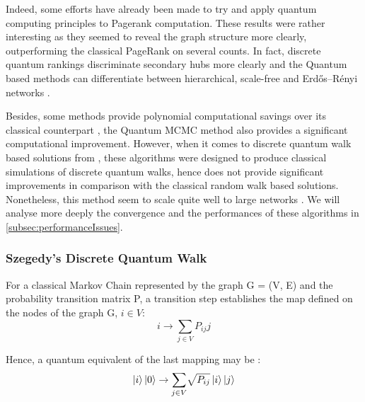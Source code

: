 \documentclass[sn-mathphys]{sn-jnl}%
\theoremstyle{thmstyleone}%
\theoremstyle{thmstyletwo}%
\theoremstyle{thmstylethree}%
\begin{document}
Indeed, some efforts \cite{paparo_2014,
  paparo_muller_comellas_martin-delgado_2013,
  sanchez-burillo_duch_gomez-gardenes_zueco_2012,
  loke_tang_rodriguez_small_wang_2016, garnerone_zanardi_lidar_2012,
  paparo_martin-delgado_2012} have already been made to try and apply
quantum computing principles to Pagerank computation. These results
were rather interesting as they seemed to reveal the graph structure
more clearly, outperforming the classical PageRank on several
counts. In fact, discrete quantum rankings discriminate secondary hubs
more clearly and the Quantum based methods can differentiate between
hierarchical, scale-free and Erdős–Rényi networks \cite{paparo_2014,
  paparo_muller_comellas_martin-delgado_2013,
  loke_tang_rodriguez_small_wang_2016}.

Besides, some methods provide polynomial computational savings over
its classical counterpart \cite{garnerone_zanardi_lidar_2012}, the
Quantum MCMC method also provides a significant computational
improvement. However, when it comes to discrete quantum walk based
solutions from \cite{paparo_2014,
  paparo_muller_comellas_martin-delgado_2013,
  paparo_martin-delgado_2012}, these algorithms were designed to
produce classical simulations of discrete quantum walks, hence does
not provide significant improvements in comparison with the classical
random walk based solutions. Nonetheless, this method seem to scale
quite well to large networks
\cite{loke_tang_rodriguez_small_wang_2016}. We will analyse more
deeply the convergence and the performances of these algorithms in
\ref{subsec:performanceIssues}.

\subsubsection{Szegedy's Discrete Quantum Walk}
\label{subsubsec:szegedy_discrete_quantum_walk}

For a classical Markov Chain represented by the graph G = (V, E) and
the probability transition matrix P, a transition step establishes the
map defined on the nodes of the graph G, $i\in V$:
\begin{equation*}
    i \rightarrow \underset{j \in V}{\sum} P_{ij} j
\end{equation*}

Hence, a quantum equivalent of the last mapping may be :
\begin{equation*}
    \ket{i}\ket{0} \rightarrow \underset{j \in V}{\sum} \sqrt{P_{ij}} \ket{i} \ket{j}
\end{equation*}
\end{document}
